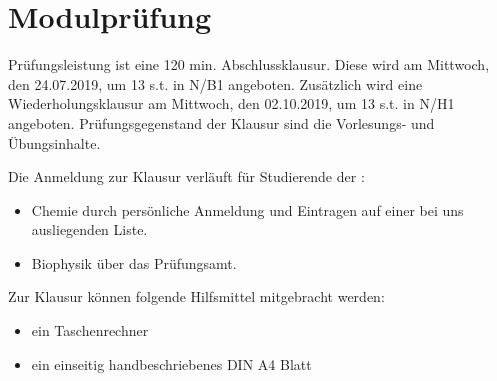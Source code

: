 \section{Modulprüfung}
Prüfungsleistung ist eine 120 min. Abschlussklausur. Diese wird am Mittwoch, den 24.07.2019, um 13 s.t. in N/B1 angeboten. Zusätzlich wird eine Wiederholungsklausur am Mittwoch, den 02.10.2019, um 13 s.t. in N/H1 angeboten. Prüfungsgegenstand der Klausur sind die Vorlesungs- und Übungsinhalte.

\vspace{0.5cm}

\noindent
Die Anmeldung zur Klausur verläuft für Studierende der :
\begin{itemize}
\item Chemie durch persönliche Anmeldung und Eintragen auf einer bei uns ausliegenden Liste. 
\item Biophysik über das Prüfungsamt.
\end{itemize}

\vspace{0.5cm}

\noindent
Zur Klausur können folgende Hilfsmittel mitgebracht werden:
\begin{itemize}
\item ein Taschenrechner
\item ein einseitig handbeschriebenes DIN A4 Blatt
\end{itemize}